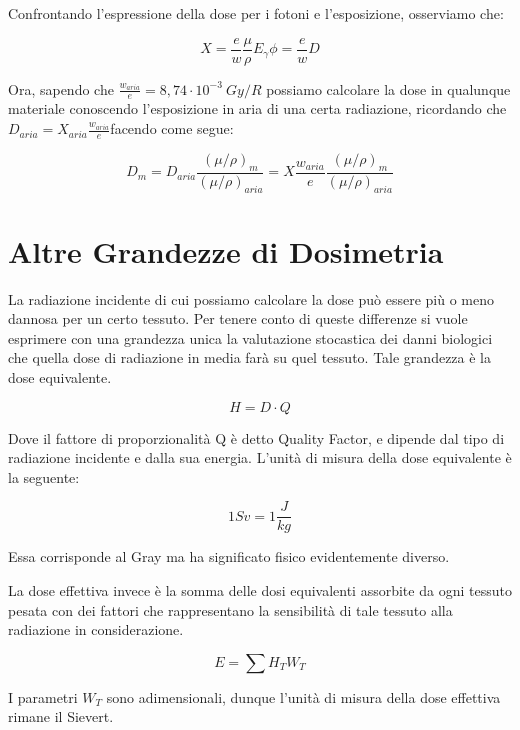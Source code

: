 \documentclass [a4paper, twoside] {book}
\begin{document}
Confrontando l'espressione della dose per i fotoni e l'esposizione, osserviamo che:

\begin{equation}
X=\frac{e}{w}\frac{\mu}{\rho}E_{\gamma}\phi=\frac{e}{w}D
\end{equation}

Ora, sapendo che $\frac{w_{aria}}{e}=8,74\cdot 10^{-3} \ Gy/R$ possiamo calcolare la dose in qualunque materiale conoscendo l'esposizione in aria di una certa radiazione, ricordando che $D_{aria}=X_{aria}\frac{w_{aria}}{e}$facendo come segue:

\begin{equation}
D_{m}=D_{aria}\frac{(\mu/\rho)_m}{(\mu/\rho)_{aria}}=X\frac{w_{aria}}{e}\frac{(\mu/\rho)_m}{(\mu/\rho)_{aria}}
\end{equation}

\section{Altre Grandezze di Dosimetria}

La radiazione incidente di cui possiamo calcolare la dose può essere più o meno dannosa per un certo tessuto. Per tenere conto di queste differenze si vuole esprimere con una grandezza unica la valutazione stocastica dei danni biologici che quella dose di radiazione in media farà su quel tessuto. Tale grandezza è la dose equivalente.

\begin{equation}
H=D\cdot Q
\end{equation}

Dove il fattore di proporzionalità Q è detto Quality Factor, e dipende dal tipo di radiazione incidente e dalla sua energia.
L'unità di misura della dose equivalente è la seguente:

\begin{equation}
1 Sv = 1 \frac{J}{kg}
\end{equation}

Essa corrisponde al Gray ma ha significato fisico evidentemente diverso.

La dose effettiva invece è la somma delle dosi equivalenti assorbite da ogni tessuto pesata con dei fattori che rappresentano la sensibilità di tale tessuto alla radiazione in considerazione.

\begin{equation}
E=\sum H_{T} W_{T}
\end{equation}

I parametri $W_{T}$ sono adimensionali, dunque l'unità di misura della dose effettiva rimane il Sievert.
\end{document}
